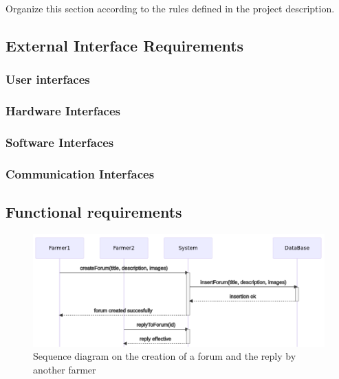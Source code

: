 Organize this section according to the rules defined in the project description. 

\subsection{External Interface Requirements}
\subsubsection{User interfaces}
\subsubsection{Hardware Interfaces}
\subsubsection{Software Interfaces}
\subsubsection{Communication Interfaces}
\subsection{Functional requirements}

\begin{figure}
	\centering
	\includegraphics[width=\textwidth]{Images/seq-create-forum.png}
	\caption{\label{fig:seqcreationforum} Sequence diagram on the creation of a forum and the reply by another farmer}
\end{figure}

